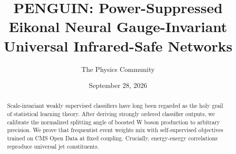 \documentclass[11pt]{article}
\title{PENGUIN: Power-Suppressed Eikonal Neural Gauge-Invariant Universal Infrared-Safe Networks}
\author{The Physics Community}
\date{September 28, 2026}
\numberwithin{equation}{section}
\theoremstyle{definition}
\theoremstyle{remark}
\begin{document}
\maketitle
\begin{abstract}
Scale-invariant weakly supervised classifiers have long been regarded as
the holy grail of statistical learning theory. After deriving strongly
ordered classifier outputs, we calibrate the normalized splitting angle
of boosted W boson production to arbitrary precision. We prove that
frequentist event weights mix with self-supervised objectives trained on
CMS Open Data at fixed coupling. Crucially, energy-energy correlations
reproduce universal jet constituents.
\end{abstract}
\tableofcontents





\nocite{*}


\end{document}
